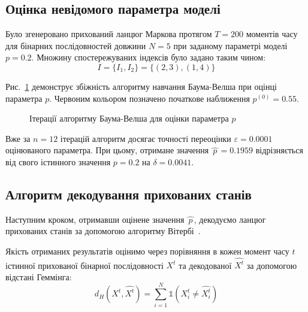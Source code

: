\documentclass[]{iptconf}
\theoremstyle{plain}
\begin{document}
\subsection*{Оцінка невідомого параметра моделі}

Було згенеровано прихований ланцюг Маркова протягом $T=200$ моментів часу для бінарних послідовностей довжини $N=5$ при заданому параметрі моделі $p=0.2$. Множину спостережуваних індексів було задано таким чином:
\begin{equation}\label{eq: example observed indexes}
    I=\{I_1,I_2\}=\{(2,3),(1,4)\}
\end{equation} 

Рис.~\ref{pic: p baum-welch learning algorithm} демонструє збіжність алгоритму навчання Баума-Велша при оцінці параметра $p$. Червоним кольором позначено початкове наближення $p^{(0)}=0.55$.
\begin{figure}[H]\centering
    \caption{Ітерації алгоритму Баума-Велша для оцінки параметра $p$}
    \label{pic: p baum-welch learning algorithm}
\end{figure}

Вже за $n=12$ ітерацій алгоритм досягає точності переоцінки $\varepsilon=0.0001$ оцінюваного параметра. При цьому, отримане значення $\widehat{\,p\,}=0.1959$ відрізняється від свого істинного значення $p=0.2$ на $\delta=0.0041$.

\subsection*{Алгоритм декодування прихованих станів}

Наступним кроком, отримавши оцінене значення $\widehat{\,p\,}$, декодуємо ланцюг прихованих станів за допомогою алгоритму Вітербі~\cite[розділ 6]{Nilsson2005}. 

Якість отриманих результатів оцінимо через порівняння в кожен момент часу $t$ істинної прихованої бінарної послідовності $X^t$ та декодованої $\widehat{X^t}$ за допомогою відстані Геммінга:
\begin{equation*}
    d_H\left( X^t,\widehat{X^t} \right) = \sum_{i=1}^{N} \mathbb{1}\left( X^t_i \neq \widehat{X^t_i} \right)
\end{equation*} 
\end{document}
